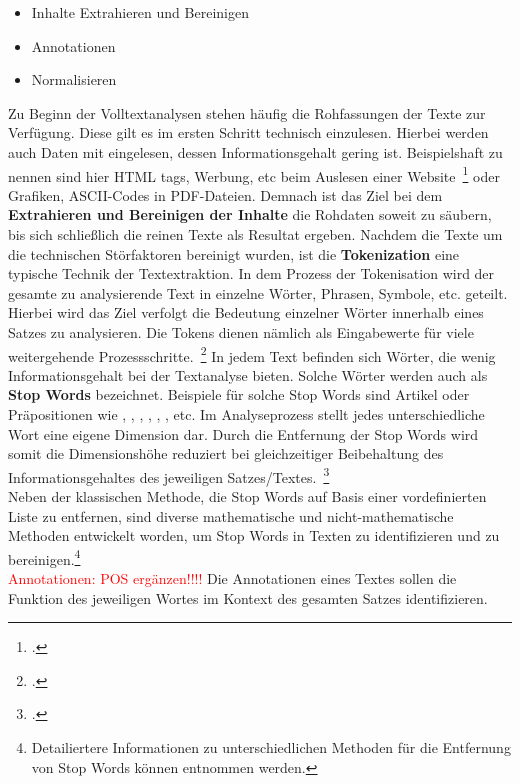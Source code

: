 \begin{itemize}
    \item Inhalte Extrahieren und Bereinigen
    \item Annotationen
    \item Normalisieren
\end{itemize}

Zu Beginn der Volltextanalysen stehen häufig die Rohfassungen der Texte zur Verfügung. Diese gilt es im ersten
Schritt technisch einzulesen. Hierbei werden auch Daten mit eingelesen, dessen Informationsgehalt gering ist.
Beispielshaft zu nennen sind hier HTML tags, Werbung, etc beim Auslesen einer Website~\footcite[\vglf][]
{pahwa.2018} oder Grafiken, ASCII-Codes in PDF-Dateien. Demnach ist das Ziel bei dem \textbf{Extrahieren und Bereinigen
der Inhalte} die Rohdaten soweit zu säubern, bis sich schließlich die reinen Texte als Resultat ergeben.
Nachdem die Texte um die technischen Störfaktoren bereinigt wurden, ist die \textbf{Tokenization} eine typische Technik
der Textextraktion.
In dem Prozess der Tokenisation wird der gesamte zu analysierende Text in einzelne Wörter, Phrasen,
Symbole, etc. geteilt.
Hierbei wird das Ziel verfolgt die Bedeutung einzelner Wörter innerhalb eines Satzes zu analysieren.
Die Tokens dienen nämlich als Eingabewerte für viele weitergehende Prozessschritte.~\footcite[\vglf][]
{gurusamy.2014}
In jedem Text befinden sich Wörter, die wenig Informationsgehalt bei der Textanalyse bieten.
Solche Wörter werden auch als \textbf{Stop Words} bezeichnet.
Beispiele für solche Stop Words sind Artikel oder
Präpositionen wie \grqq, \grqq, \grqq, \grqq,
\grqq, \grqq, etc.
Im Analyseprozess stellt jedes unterschiedliche Wort eine eigene Dimension dar.
Durch die Entfernung der Stop Words wird somit die Dimensionshöhe reduziert bei gleichzeitiger Beibehaltung des
Informationsgehaltes des jeweiligen Satzes/Textes.~\footcite[\vglf][]{mohan.2015}\\
Neben der klassischen Methode, die Stop Words auf Basis einer vordefinierten Liste zu entfernen, sind diverse
mathematische und nicht-mathematische Methoden entwickelt worden, um Stop Words in Texten zu identifizieren und zu
bereinigen.\footnote{Detailiertere Informationen zu unterschiedlichen Methoden für die Entfernung von Stop Words
können \cite{mohan.2015} entnommen werden.}\\

\textcolor{red}{Annotationen: POS ergänzen!!!!}
Die Annotationen eines Textes sollen die Funktion des jeweiligen Wortes im Kontext des gesamten Satzes identifizieren.
\\


